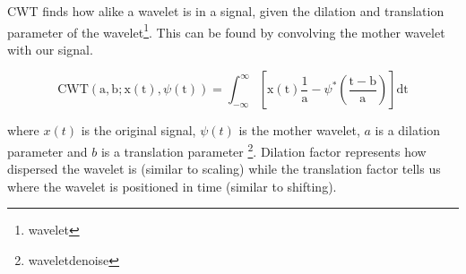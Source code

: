 \begin{enumerate}[label=\textbf{\arabic*})]
    CWT finds how alike a wavelet is in a signal, given the dilation and translation parameter of the wavelet\footnote{wavelet}. 
    This can be found by convolving the mother wavelet with our signal.

    \begin{equation*} 
        \text{CWT}(\mathrm{a},\mathrm{b}; \mathrm{x}(\mathrm{t}),\psi(\mathrm{t}))=\int_{-\infty}^{\infty}[\mathrm{x}(\mathrm{t})\frac{1}{\mathrm{a}}-\psi^{*}(\frac{\mathrm{t}-\mathrm{b}}{\mathrm{a}})]\text{dt}
    \end{equation*}

    where \(x(t)\) is the original signal, \(\psi(t)\) is the mother wavelet, \(a\) is a dilation parameter and \(b\) is a translation parameter \footnote{waveletdenoise}.
    Dilation factor represents how dispersed the wavelet is (similar to scaling) while the translation factor tells us where the wavelet is
    positioned in time (similar to shifting). 
    

\end{enumerate}
